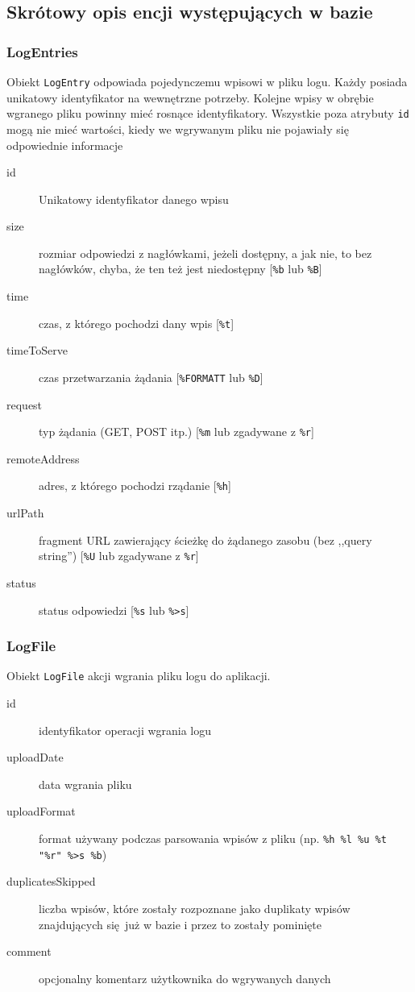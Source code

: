 \documentclass[a4paper, 10pt]{article}
\begin{document}
    
    \subsection{Skrótowy opis encji występujących w bazie}
    
    \subsubsection{LogEntries}
    Obiekt \texttt{LogEntry} odpowiada pojedynczemu wpisowi w pliku logu. Każdy posiada unikatowy identyfikator na wewnętrzne potrzeby. Kolejne wpisy w obrębie wgranego pliku powinny mieć rosnące identyfikatory. Wszystkie poza atrybuty  \texttt{id} mogą nie mieć wartości, kiedy we wgrywanym pliku nie pojawiały się odpowiednie informacje
    
    \begin{description}
        \item[id] Unikatowy identyfikator danego wpisu
        \item[size] rozmiar odpowiedzi z nagłówkami, jeżeli dostępny, a jak nie, to bez nagłówków, chyba, że ten też jest niedostępny [\texttt{\%b} lub \texttt{\%B}]
        \item[time] czas, z którego pochodzi dany wpis [\texttt{\%t}]
        \item[timeToServe] czas przetwarzania żądania [\texttt{\%{FORMAT}T} lub \texttt{\%D}]
        \item[request] typ żądania (GET, POST itp.) [\texttt{\%m} lub zgadywane z \texttt{\%r}]
        \item[remoteAddress] adres, z którego pochodzi rządanie [\texttt{\%h}]
        \item[urlPath] fragment URL zawierający ścieżkę do żądanego zasobu (bez ,,query string'') [\texttt{\%U} lub zgadywane z \texttt{\%r}]
        \item[status] status odpowiedzi [\texttt{\%s} lub \texttt{\%>s}]
    \end{description}
    
    \subsubsection{LogFile}
    Obiekt \texttt{LogFile} akcji wgrania pliku logu do aplikacji. 
    
    \begin{description}
        \item[id] identyfikator operacji wgrania logu
        \item[uploadDate] data wgrania pliku
        \item[uploadFormat] format używany podczas parsowania wpisów z pliku (np. \texttt{\%h \%l \%u \%t "\%r" \%>s \%b})
        \item[duplicatesSkipped] liczba wpisów, które zostały rozpoznane jako duplikaty wpisów znajdujących się już w bazie i przez to zostały pominięte
        \item[comment] opcjonalny komentarz użytkownika do wgrywanych danych
    \end{description}
    
\end{document}
